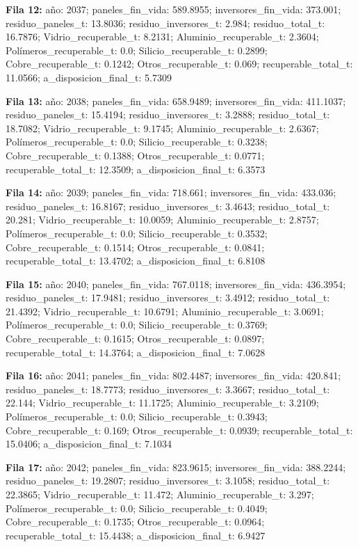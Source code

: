 {\footnotesize\textbf{Fila 12:} año: 2037; paneles\_fin\_vida: 589.8955; inversores\_fin\_vida: 373.001; residuo\_paneles\_t: 13.8036; residuo\_inversores\_t: 2.984; residuo\_total\_t: 16.7876; Vidrio\_recuperable\_t: 8.2131; Aluminio\_recuperable\_t: 2.3604; Polímeros\_recuperable\_t: 0.0; Silicio\_recuperable\_t: 0.2899; Cobre\_recuperable\_t: 0.1242; Otros\_recuperable\_t: 0.069; recuperable\_total\_t: 11.0566; a\_disposicion\_final\_t: 5.7309\par}
{\footnotesize\textbf{Fila 13:} año: 2038; paneles\_fin\_vida: 658.9489; inversores\_fin\_vida: 411.1037; residuo\_paneles\_t: 15.4194; residuo\_inversores\_t: 3.2888; residuo\_total\_t: 18.7082; Vidrio\_recuperable\_t: 9.1745; Aluminio\_recuperable\_t: 2.6367; Polímeros\_recuperable\_t: 0.0; Silicio\_recuperable\_t: 0.3238; Cobre\_recuperable\_t: 0.1388; Otros\_recuperable\_t: 0.0771; recuperable\_total\_t: 12.3509; a\_disposicion\_final\_t: 6.3573\par}
{\footnotesize\textbf{Fila 14:} año: 2039; paneles\_fin\_vida: 718.661; inversores\_fin\_vida: 433.036; residuo\_paneles\_t: 16.8167; residuo\_inversores\_t: 3.4643; residuo\_total\_t: 20.281; Vidrio\_recuperable\_t: 10.0059; Aluminio\_recuperable\_t: 2.8757; Polímeros\_recuperable\_t: 0.0; Silicio\_recuperable\_t: 0.3532; Cobre\_recuperable\_t: 0.1514; Otros\_recuperable\_t: 0.0841; recuperable\_total\_t: 13.4702; a\_disposicion\_final\_t: 6.8108\par}
{\footnotesize\textbf{Fila 15:} año: 2040; paneles\_fin\_vida: 767.0118; inversores\_fin\_vida: 436.3954; residuo\_paneles\_t: 17.9481; residuo\_inversores\_t: 3.4912; residuo\_total\_t: 21.4392; Vidrio\_recuperable\_t: 10.6791; Aluminio\_recuperable\_t: 3.0691; Polímeros\_recuperable\_t: 0.0; Silicio\_recuperable\_t: 0.3769; Cobre\_recuperable\_t: 0.1615; Otros\_recuperable\_t: 0.0897; recuperable\_total\_t: 14.3764; a\_disposicion\_final\_t: 7.0628\par}
{\footnotesize\textbf{Fila 16:} año: 2041; paneles\_fin\_vida: 802.4487; inversores\_fin\_vida: 420.841; residuo\_paneles\_t: 18.7773; residuo\_inversores\_t: 3.3667; residuo\_total\_t: 22.144; Vidrio\_recuperable\_t: 11.1725; Aluminio\_recuperable\_t: 3.2109; Polímeros\_recuperable\_t: 0.0; Silicio\_recuperable\_t: 0.3943; Cobre\_recuperable\_t: 0.169; Otros\_recuperable\_t: 0.0939; recuperable\_total\_t: 15.0406; a\_disposicion\_final\_t: 7.1034\par}
{\footnotesize\textbf{Fila 17:} año: 2042; paneles\_fin\_vida: 823.9615; inversores\_fin\_vida: 388.2244; residuo\_paneles\_t: 19.2807; residuo\_inversores\_t: 3.1058; residuo\_total\_t: 22.3865; Vidrio\_recuperable\_t: 11.472; Aluminio\_recuperable\_t: 3.297; Polímeros\_recuperable\_t: 0.0; Silicio\_recuperable\_t: 0.4049; Cobre\_recuperable\_t: 0.1735; Otros\_recuperable\_t: 0.0964; recuperable\_total\_t: 15.4438; a\_disposicion\_final\_t: 6.9427\par}
